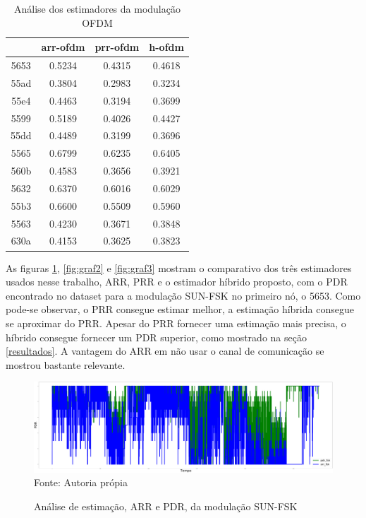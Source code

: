 \begin{table}[H]
\centering
\begin{tabular}{|c|ccc|}
\hline
\multicolumn{1}{|c|}{}     & \multicolumn{1}{c|}{arr-ofdm} & \multicolumn{1}{c|}{prr-ofdm} & \multicolumn{1}{c|}{h-ofdm} \\ \hline
\multicolumn{1}{|c|}{5653} & \multicolumn{1}{c}{0.5234}    & \multicolumn{1}{c}{0.4315}    & \multicolumn{1}{c|}{0.4618} \\ \cline{1-1}
55ad & 0.3804 & 0.2983 & 0.3234 \\ \cline{1-1}
55e4 & 0.4463 & 0.3194 & 0.3699 \\ \hline
5599 & 0.5189 & 0.4026 & 0.4427 \\ \cline{1-1}
55dd & 0.4489 & 0.3199 & 0.3696 \\ \cline{1-1}
5565 & 0.6799 & 0.6235 & 0.6405 \\ \cline{1-1}
560b & 0.4583 & 0.3656 & 0.3921 \\ \hline
5632 & 0.6370 & 0.6016 & 0.6029 \\ \cline{1-1}
55b3 & 0.6600 & 0.5509 & 0.5960 \\ \cline{1-1}
5563 & 0.4230 & 0.3671 & 0.3848 \\ \cline{1-1}
630a & 0.4153 & 0.3625 & 0.3823 \\ \hline
\end{tabular}
\caption{Análise dos estimadores da modulação OFDM}
\label{tab:est3}
\end{table}

As figuras \ref{fig:graf1}, \ref{fig:graf2} e \ref{fig:graf3} mostram o comparativo dos três estimadores usados nesse trabalho, ARR, PRR e o estimador híbrido proposto, com o PDR encontrado no dataset  \cite{tuset2020evaluating} para a modulação SUN-FSK no primeiro nó, o 5653. Como pode-se observar, o PRR consegue estimar melhor, a estimação híbrida consegue se aproximar do PRR. Apesar do PRR fornecer uma estimação mais precisa, o híbrido consegue fornecer um PDR superior, como mostrado na seção \ref{resultados}. A vantagem do ARR em não usar o canal de comunicação se mostrou bastante relevante. 

\begin{figure}[H]
    \centering
    \caption{\footnotesize Análise de estimação, ARR e PDR, da modulação SUN-FSK}
    \includegraphics[scale = 0.08]{sections/textual/Imagens/5653_arr_fsk.pdf}\\
    Fonte: Autoria própia
    \label{fig:graf1}
\end{figure}

